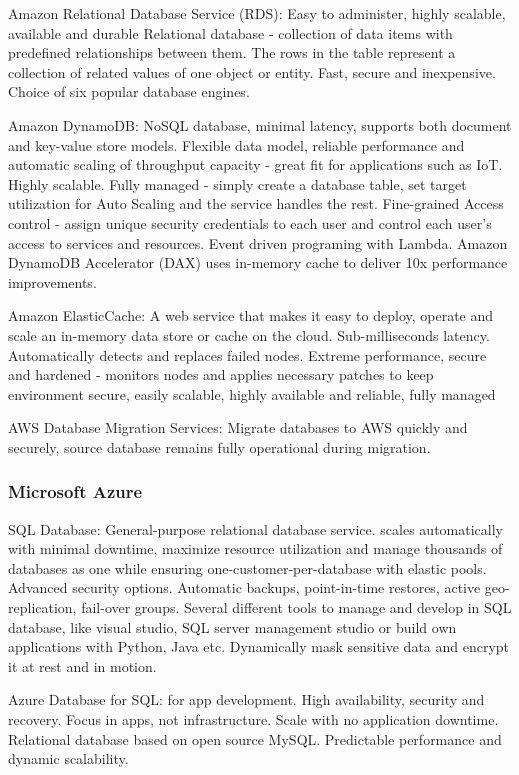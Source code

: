Amazon Relational Database Service (RDS):  Easy to administer, highly scalable, available and durable  Relational database - collection of data items with predefined relationships between them. The rows in the table represent a collection of related values of one object or entity. Fast, secure and inexpensive. Choice of six popular database engines. 

Amazon DynamoDB: NoSQL database, minimal latency, supports both document and key-value store models. Flexible data model, reliable performance and automatic scaling of throughput capacity - great fit for applications such as IoT. Highly scalable. Fully managed - simply create a database table, set target utilization for Auto Scaling and the service handles the rest. Fine-grained Access control - assign unique security credentials to each user and control each user's access to services and resources. Event driven programing with Lambda. Amazon DynamoDB Accelerator (DAX) uses in-memory cache to deliver 10x performance improvements. 

Amazon ElasticCache: A web service that makes it easy to deploy, operate and scale an in-memory data store or cache on the cloud. Sub-milliseconds latency. Automatically detects and replaces failed nodes. Extreme performance, secure and hardened - monitors nodes and applies necessary patches to keep environment secure, easily scalable, highly available and reliable, fully managed

AWS Database Migration Services: Migrate databases to AWS quickly and securely, source database remains fully operational during migration. 


\subsubsection{Microsoft Azure}

SQL Database: General-purpose relational database service. scales automatically with minimal downtime, maximize resource utilization and manage thousands of databases as one while ensuring one-customer-per-database with elastic pools. Advanced security options. Automatic backups, point-in-time restores, active geo-replication, fail-over groups. Several different tools to manage and develop in SQL database, like visual studio, SQL server management studio or build own applications with Python, Java etc. Dynamically mask sensitive data and encrypt it at rest and in motion. 

Azure Database for SQL: for app development. High availability, security and recovery. Focus in apps, not infrastructure. Scale with no application downtime. Relational database based on open source MySQL. Predictable performance and dynamic scalability. 

